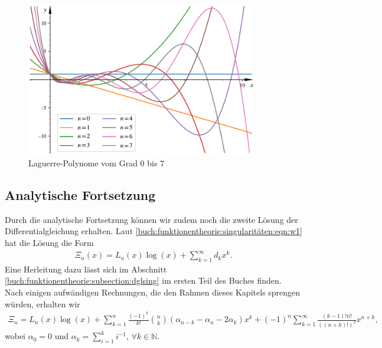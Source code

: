 \begin{figure}
\centering
\includegraphics[width=0.9\textwidth]{papers/laguerre/images/laguerre_poly.pdf}
\caption{Laguerre-Polynome vom Grad $0$ bis $7$}
\label{laguerre:fig:polyeval}
\end{figure}

\subsection{Analytische Fortsetzung}
%
Durch die analytische Fortsetzung können wir zudem noch die zweite Lösung der
Differentialgleichung erhalten.
Laut \eqref{buch:funktionentheorie:singularitäten:eqn:w1} hat die Lösung
die Form
\begin{align*}
\Xi_n(x)
=
L_n(x) \log(x) + \sum_{k=1}^\infty d_k x^k
.
\end{align*}
Eine Herleitung dazu lässt sich im
Abschnitt \ref{buch:funktionentheorie:subsection:dglsing}
im ersten Teil des Buches finden.
Nach einigen aufwändigen Rechnungen,
die den Rahmen dieses Kapitels sprengen würden,
erhalten wir
\begin{align*}
\Xi_n
=
L_n(x) \log(x)
+
\sum_{k=1}^n \frac{(-1)^k}{k!} \binom{n}{k}
(\alpha_{n-k} - \alpha_n - 2 \alpha_k)x^k
+
(-1)^n \sum_{k=1}^\infty \frac{(k-1)!n!}{((n+k)!)^2} x^{n+k},
\end{align*}
wobei $\alpha_0 = 0$ und $\alpha_k =\sum_{i=1}^k i^{-1}$,
$\forall k \in \mathbb{N}$.
